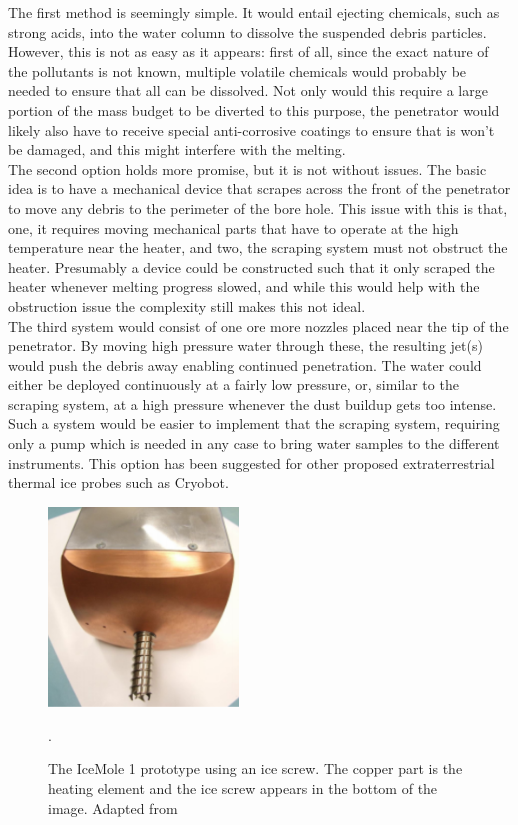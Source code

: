 \noindent
The first method is seemingly simple. It would entail ejecting chemicals, such as strong acids, into the water column to dissolve the suspended debris particles. However, this is not as easy as it appears: first of all, since the exact nature of the pollutants is not known, multiple volatile chemicals would probably be needed to ensure that all can be dissolved. Not only would this require a large portion of the mass budget to be diverted to this purpose, the penetrator would likely also have to receive special anti-corrosive coatings to ensure that is won't be damaged, and this might interfere with the melting.\\

\noindent
The second option holds more promise, but it is not without issues. The basic idea is to have a mechanical device that scrapes across the front of the penetrator to move any debris to the perimeter of the bore hole. This issue with this is that, one, it requires moving mechanical parts that have to operate at the high temperature near the heater, and two, the scraping system must not obstruct the heater. Presumably a device could be constructed such that it only scraped the heater whenever melting progress slowed, and while this would help with the obstruction issue the complexity still makes this not ideal.\\

\noindent
The third system would consist of one ore more nozzles placed near the tip of the penetrator. By moving high pressure water through these, the resulting jet(s) would push the debris away enabling continued penetration. The water could either be deployed continuously at a fairly low pressure, or, similar to the scraping system, at a high pressure whenever the dust buildup gets too intense. Such a system would be easier to implement that the scraping system, requiring only a pump which is needed in any case to bring water samples to the different instruments. This option has been suggested for other proposed extraterrestrial thermal ice probes such as Cryobot\cite{article:zimmerman2001a}.\\

 \begin{figure}[ht]
 	\centering
 	\includegraphics[width=0.45\textwidth]{figures/LAMC/iceScrew}
 	\caption{The IceMole 1 prototype using an ice screw. The copper part is the heating element and the ice screw appears in the bottom of the image. Adapted from \cite{article:dachwald2014a}}.
 	\label{fig:iceScrew}
 \end{figure}   
 
